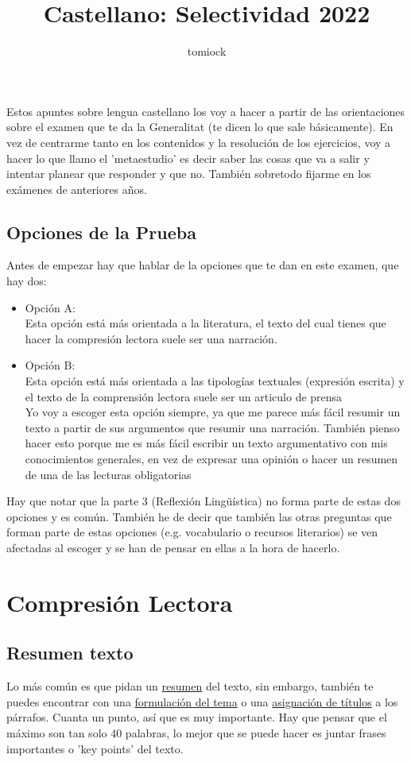 \documentclass[arial,a4paper,print]{article}
\title{Castellano: Selectividad 2022}
\author{tomiock}
\begin{document}
	
	\maketitle
	
Estos apuntes sobre lengua castellano los voy a hacer a partir de las orientaciones sobre el examen que te da la Generalitat (te dicen lo que sale básicamente). En vez de centrarme tanto en los contenidos y la resolución de los ejercicios, voy a hacer lo que llamo el 'metaestudio' es decir saber las cosas que va a salir y intentar planear que responder y que no. También sobretodo fijarme en los exámenes de anteriores años. 

\subsection{Opciones de la Prueba}
Antes de empezar hay que hablar de la opciones que te dan en este examen, que hay dos:
\begin{itemize}
\item Opción A:\\
Esta opción está más orientada a la literatura, el texto del cual tienes que hacer la compresión lectora suele ser una narración. 
\item Opción B:\\
Esta opción está más orientada a las tipologías textuales (expresión escrita) y el texto de la comprensión lectora suele ser un articulo de prensa \\
Yo voy a escoger esta opción siempre, ya que me parece más fácil resumir un texto a partir de sus argumentos que resumir una narración. También pienso hacer esto porque me es más fácil escribir un texto argumentativo con mis conocimientos generales, en vez de expresar una opinión o hacer un resumen de una de las lecturas obligatorias 
\end{itemize}
Hay que notar que la parte 3 (Reflexión Lingüística) no forma parte de estas dos opciones y es común. 
También he de decir que también las otras preguntas que forman parte de estas opciones (e.g. vocabulario o recursos literarios) se ven afectadas al escoger y se han de pensar en ellas a la hora de hacerlo. 

\section{Compresión Lectora}
\subsection{Resumen texto}
Lo más común es que pidan un \underline{resumen} del texto, sin embargo, también te puedes encontrar con una \underline{formulación del tema} o una \underline{asignación de títulos} a los párrafos. Cuanta un punto, así que es muy importante. Hay que pensar que el máximo son tan solo 40 palabras, lo mejor que se puede hacer es juntar frases importantes o 'key points' del texto. 
\end{document}
